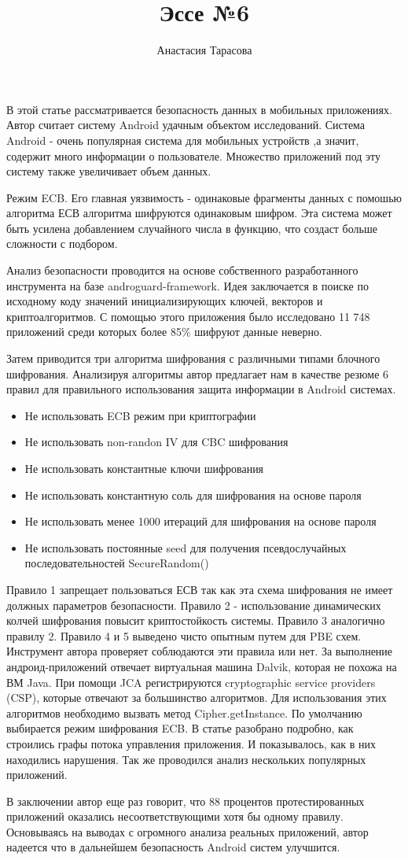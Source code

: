 \documentclass{article}
\title{Эссе №6}
\author{Анастасия Тарасова}
\begin{document}
	\maketitle

В этой статье рассматривается безопасность данных в мобильных приложениях. Автор считает систему Android  удачным объектом исследований. Система Android - очень популярная система для мобильных устройств ,а значит, содержит много информации о пользователе. Множество приложений под эту систему также увеличивает объем данных.

Режим ECB. Его главная уязвимость - одинаковые фрагменты данных с помошью алгоритма ЕСВ алгоритма шифруются одинаковым шифром. Эта система может быть усилена добавлением случайного числа в функцию, что создаст больше сложности с подбором.

Анализ безопасности проводится на основе собственного разработанного инструмента на базе androguard-framework. Идея заключается в поиске по исходному коду значений инициализирующих ключей, векторов и криптоалгоритмов. С помощью этого приложения было исследовано 11 748 приложений среди которых более 85\% шифруют данные неверно.

Затем приводится три алгоритма шифрования с различными типами блочного шифрования. Анализируя алгоритмы автор предлагает нам в качестве резюме 6 правил для правильного использования защита информации в Android системах.

\begin{itemize}
\item Не использовать ECB режим при криптографии
\item Не использовать non-randon IV для CBC шифрования
\item Не использовать константные ключи шифрования
\item Не использовать константную соль для шифрования на основе пароля
\item Не использовать менее 1000 итераций для шифрования на основе пароля
\item Не использовать постоянные seed для получения псевдослучайных последовательностей SecureRandom()
\end{itemize}

Правило 1 запрещает пользоваться ЕСВ так как эта схема шифрования не имеет должных параметров безопасности.
Правило 2 - использование динамических колчей шифрования повысит криптостойкость системы.
Правило 3 аналогично правилу 2.
Правило 4 и 5 выведено чисто опытным путем для PBE схем.
Инструмент автора проверяет соблюдаются эти правила или нет. За выполнение андроид-приложений отвечает виртуальная машина Dalvik, которая не похожа на ВМ Java. При помощи JCA регистрируются cryptographic service providers (CSP), которые отвечают за большинство алгоритмов. Для использования этих алгоритмов необходимо вызвать метод Cipher.getInstance. По умолчанию выбирается режим шифрования ECB. В статье разобрано подробно, как строились графы потока управления приложения. И показывалось, как в них находились нарушения. Так же проводился анализ нескольких популярных приложений.

В заключении автор еще раз говорит, что 88 процентов протестированных приложений оказались несоответствующими хотя бы одному правилу. Основываясь на выводах с огромного анализа реальных приложений, автор надеется что в дальнейшем безопасность Android систем улучшится. 
	
\end{document}
